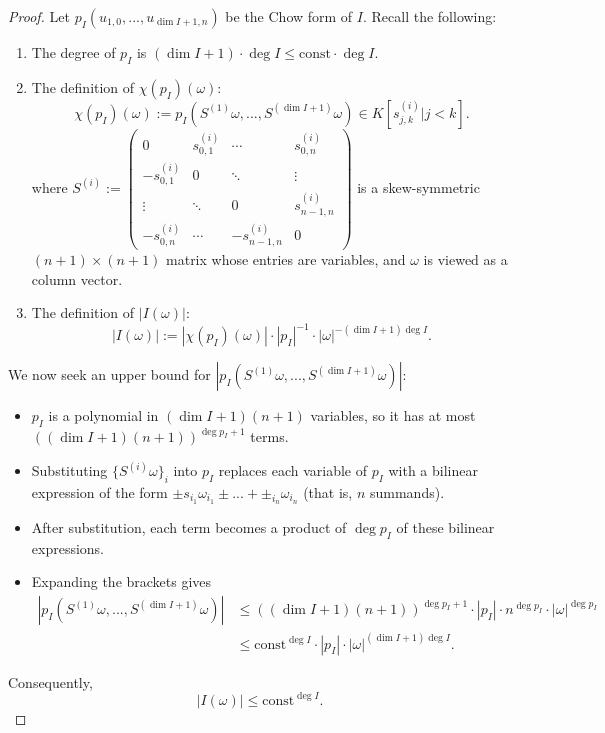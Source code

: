 \documentclass[reqno]{amsart}
\theoremstyle{plain}
\theoremstyle{definition}
\theoremstyle{remark}
\theoremstyle{plain}
\begin{document}
\begin{proof}
Let $p_I(u_{1,0},...,u_{\dim I+1,n})$ be the Chow form of $I$.
Recall the following:
\begin{enumerate}
    \item The degree of $p_I$ is $(\dim I+1)\cdot\deg I\leq\mathrm{const}\cdot\deg I$.
    \item The definition of $\chi(p_I)(\omega)$:
\[
    \chi(p_I)(\omega)
        :=
    p_I(S^{(1)}\omega,...,S^{(\dim I+1)}\omega)
    \in
     K[s^{(i)}_{j,k} | j<k]
.\]
where $S^{(i)}:=
    \begin{pmatrix}
    0 & s^{(i)}_{0,1} & \cdots & s^{(i)}_{0,n} \\
    -s^{(i)}_{0,1} & 0 & \ddots & \vdots \\
    \vdots & \ddots & 0 & s^{(i)}_{n-1,n} \\
    -s^{(i)}_{0,n} & \cdots & -s^{(i)}_{n-1,n} & 0
    \end{pmatrix}
    $ is a skew-symmetric $(n+1)\times(n+1)$ matrix whose entries are variables, and $\omega$ is viewed as a column vector.
    \item The definition of $|I(\omega)|$:
\[
    |I(\omega)|
        :=
    |\chi(p_I)(\omega)|\cdot|p_I|^{-1}\cdot|\omega|^{-(\dim I + 1)\deg I}
.\]
\end{enumerate}

We now seek an upper bound for $|p_I(S^{(1)}\omega,...,S^{(\dim I+1)}\omega)|$:
\begin{itemize}
    \item $p_I$ is a polynomial in $(\dim I+1)(n+1)$ variables, so it has at most $((\dim I+1)(n+1))^{\deg p_I+1}$ terms.
    \item Substituting $\{S^{(i)}\omega\}_i$ into $p_I$ replaces each variable of $p_I$ with a bilinear expression of the form $\pm s_{i_1}\omega_{i_1}\pm...+\pm_{i_n}\omega_{i_n}$ (that is, $n$ summands).
    \item After substitution, each term becomes a product of $\deg p_I$ of these bilinear expressions.
    \item Expanding the brackets gives
\begin{align*}
    |p_I(S^{(1)}\omega,...,S^{(\dim I+1)}\omega)|
        &\leq
    ((\dim I+1)(n+1))^{\deg p_I+1}\cdot|p_I|\cdot n^{\deg p_I}\cdot|\omega|^{\deg p_I}\\
    &\leq
    \mathrm{const}^{\deg I}\cdot|p_I|\cdot|\omega|^{(\dim I+1)\deg I}
.\end{align*}
\end{itemize}
Consequently,
\[
    |I(\omega)|
        \leq
    \mathrm{const}^{\deg I}
.\]
\end{proof}
\end{document}
